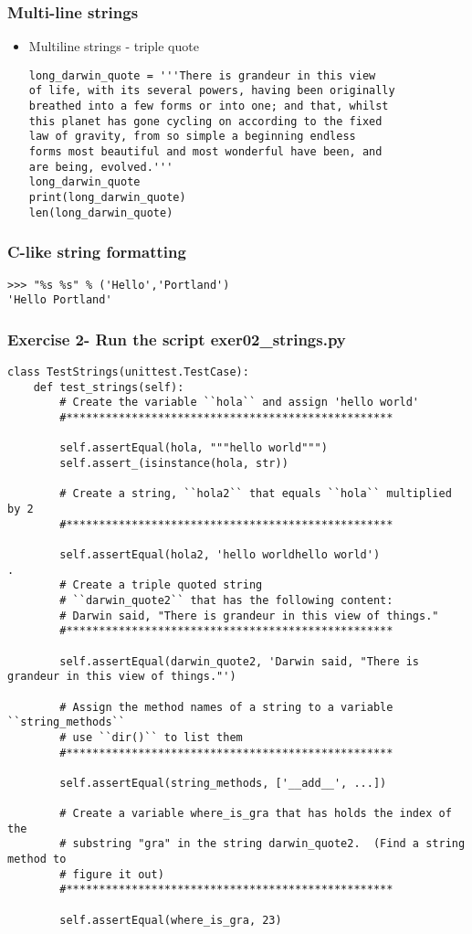 \documentclass{beamer}
\newcommand\Fontvi{\fontsize{6}{7.2}\selectfont}
\newcommand\Fontix{\fontsize{9}{8.3}\selectfont}
\begin{document}
\begin{frame}[fragile]
\frametitle{Multi-line strings}
\Fontix
\begin{itemize}
\item Multiline strings - triple quote
\begin{lstlisting}
long_darwin_quote = '''There is grandeur in this view
of life, with its several powers, having been originally 
breathed into a few forms or into one; and that, whilst 
this planet has gone cycling on according to the fixed 
law of gravity, from so simple a beginning endless 
forms most beautiful and most wonderful have been, and 
are being, evolved.'''
long_darwin_quote
print(long_darwin_quote)
len(long_darwin_quote)
\end{lstlisting}
\end{itemize}
\end{frame}

\begin{frame}[fragile]
\frametitle{C-like string formatting}
\begin{lstlisting}
>>> "%s %s" % ('Hello','Portland')
'Hello Portland'
\end{lstlisting}
\end{frame}

\begin{frame}[fragile]
\frametitle{Exercise 2- Run the script exer02\_strings.py}
\Fontvi
\begin{lstlisting}
class TestStrings(unittest.TestCase):
    def test_strings(self):
        # Create the variable ``hola`` and assign 'hello world'
        #**************************************************

        self.assertEqual(hola, """hello world""")
        self.assert_(isinstance(hola, str))

        # Create a string, ``hola2`` that equals ``hola`` multiplied by 2
        #**************************************************

        self.assertEqual(hola2, 'hello worldhello world')
.
        # Create a triple quoted string
        # ``darwin_quote2`` that has the following content:
        # Darwin said, "There is grandeur in this view of things."
        #**************************************************

        self.assertEqual(darwin_quote2, 'Darwin said, "There is grandeur in this view of things."')

        # Assign the method names of a string to a variable ``string_methods``
        # use ``dir()`` to list them
        #**************************************************

        self.assertEqual(string_methods, ['__add__', ...])

        # Create a variable where_is_gra that has holds the index of the
        # substring "gra" in the string darwin_quote2.  (Find a string method to
        # figure it out)
        #**************************************************

        self.assertEqual(where_is_gra, 23)

\end{lstlisting}
\end{frame}
\end{document}
